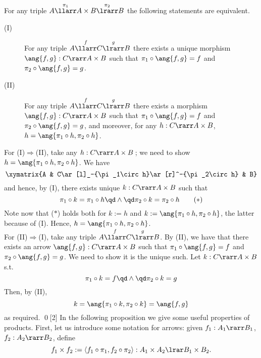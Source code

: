 \documentclass{svmult}
\begin{document}
\begin{myproposition}\label{p:prod}
For any triple $A\overset{\pi_1}{\llarr}A\times B\overset{\pi_2}{\lrarr}B$ the following statements are equivalent.
\begin{description}
\item[(I)] For any triple $A\overset{f}{\llarr}C\overset{g}{\lrarr}B$ there exists a {unique} morphism $\ang{f,g}:C\rarr A\times B$
                        such that $\pi_1\circ\ang{f,g}=f$ and $\pi_2\circ\ang{f,g}=g$.
\item[(II)]For any triple $A\overset{f}{\llarr}C\overset{g}{\lrarr}B$ there exists a morphism $\ang{f,g}:C\rarr A\times B$
                        such that $\pi_1\circ\ang{f,g}=f$ and $\pi_2\circ\ang{f,g}=g$, and
                        moreover, for any $h:C\rarr A\times B$, $h=\ang{\pi_1\circ h,\pi_2\circ h}$.
\end{description}
\end{myproposition}
\proof
%
For (I)$\Rightarrow$(II), take any $h:C\rarr A\times B$\,; we need to show $h=\ang{\pi_1\circ h,\pi_2\circ h}$. We have
\[ \xymatrix{A & C\ar[l]_-{\pi_1\circ h}\ar[r]^-{\pi_2\circ h} & B} \]
and hence, by (I), there exists unique $k:C\rarr A\times B$ such that
\[ \pi_1\circ k= \pi_1\circ h \qd\land\qd \pi_2\circ k= \pi_2\circ h \tag{$*$}\]
Note now that ($*$) holds both for $k:=h$ and $k:=\ang{\pi_1\circ h,\pi_2\circ h}$, the latter because of (I). Hence, $h=\ang{\pi_1\circ h,\pi_2\circ
h}$.
\\
For (II)$\Rightarrow$(I), take any triple $A\overset{f}{\llarr}C\overset{g}{\lrarr}B$. By (II), we have that there exists an arrow $\ang{f,g}:C\rarr
A\times B$ such that $\pi_1\circ\ang{f,g}=f$ and $\pi_2\circ\ang{f,g}=g$. We need to show it is the unique such. Let $k:C\rarr A\times B$ s.t.
\[ \pi_1\circ k= f \qd\land\qd \pi_2\circ k= g \]
Then, by (II),
\[ k=\ang{\pi_1\circ k,\pi_2\circ k}=\ang{f,g} \]
as required. \qed[2]
%
In the following proposition we give some useful properties of products. First, let us introduce some notation for arrows: given $f_{1} : A_{1} \rarr
B_{1}$, $f_{2} : A_{2} \rarr B_{2}$, define
\[ f_{1} \times f_{2}  := \langle f_{1} \circ \pi_{1},  f_{2} \circ \pi_{2} \rangle : A_{1} \times A_{2} \lrar B_{1} \times B_{2}. \]
\end{document}
